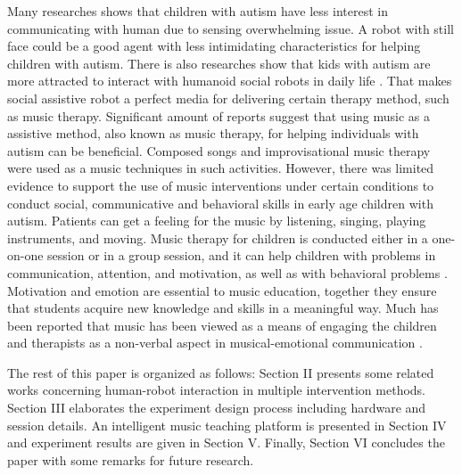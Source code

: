 \documentclass[conference]{IEEEtran}
\begin{document}
Many researches shows that children with autism
have less interest in communicating with human due to sensing overwhelming issue. A robot with still
face could be a good agent with less intimidating characteristics for helping children with autism.
There is also researches show that kids with autism are more attracted to interact with humanoid 
social robots in daily life \cite{wainer2010collaborating, robins2012embodiment,costa2013your, feng2013can}.
That makes social assistive robot a perfect media for delivering certain therapy method, such as 
music therapy. Significant amount of reports suggest that using music as a assistive method, also known as music therapy, for 
helping individuals with autism can be beneficial. Composed songs and improvisational
music therapy were used as a music techniques in such activities. However, there 
was limited evidence to support the use of music interventions under certain
conditions to conduct social, communicative and behavioral skills in early age children 
with autism. Patients can get a feeling for the music by listening, singing, playing instruments, and moving. Music
therapy for children is conducted either in a one-on-one session or in a group session, and
it can help children with problems in communication, attention, and motivation, as well as 
with behavioral problems \cite{gifford2011using}. Motivation and emotion are essential to music 
education, together they ensure that students acquire new knowledge and skills in a meaningful way.
Much has been reported that music has been viewed as a means of engaging the children and 
therapists as a non-verbal aspect in musical-emotional communication \cite{warwick1991music}.

The rest of this paper is organized as follows: Section II presents some related works concerning
human-robot interaction in multiple intervention methods. Section III elaborates the experiment 
design process including hardware and session details. An intelligent music teaching platform is
presented in Section IV and experiment results are given in Section V. Finally, Section VI concludes
the paper with some remarks for future research. \\
\end{document}
